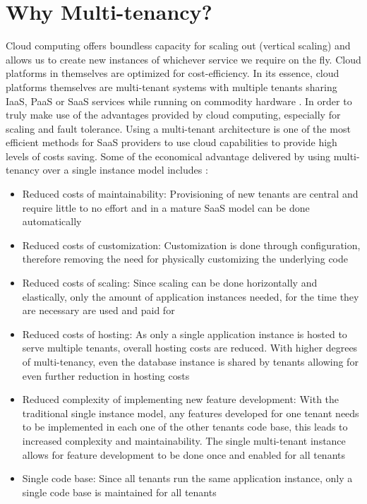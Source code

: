 \section{Why Multi-tenancy?}

Cloud computing offers boundless capacity for scaling out (vertical scaling) and allows us to create new instances of whichever service we require on the fly. Cloud platforms in themselves are optimized for cost-efficiency. In its essence, cloud platforms themselves are multi-tenant systems with multiple tenants sharing IaaS, PaaS or SaaS services while running on commodity hardware \cite{Wilder2012-so}. In order to truly make use of the advantages provided by cloud computing, especially for scaling and fault tolerance. Using a multi-tenant architecture is one of the most efficient methods for SaaS providers to use cloud capabilities to provide high levels of costs saving.
Some of the economical advantage delivered by using multi-tenancy over a single instance model includes \cite{Betts2012-ad}:
\begin{itemize}
\item Reduced costs of maintainability: Provisioning of new tenants are central and require little to no effort and in a mature SaaS model can be done automatically
\item Reduced costs of customization: Customization is done through configuration, therefore removing the need for physically customizing the underlying code
\item Reduced costs of scaling: Since scaling can be done horizontally and elastically, only the amount of application instances needed, for the time they are necessary are used and paid for
\item Reduced costs of hosting: As only a single application instance is hosted to serve multiple tenants, overall hosting costs are reduced. With higher degrees of multi-tenancy, even the database instance is shared by tenants allowing for even further reduction in hosting costs
\item Reduced complexity of implementing new feature development: With the traditional single instance model, any features developed for one tenant needs to be implemented in each one of the other tenants code base, this leads to increased complexity and maintainability. The single multi-tenant instance allows for feature development to be done once and enabled for all tenants
\item Single code base: Since all tenants run the same application instance, only a single code base is maintained for all tenants
\end{itemize}


